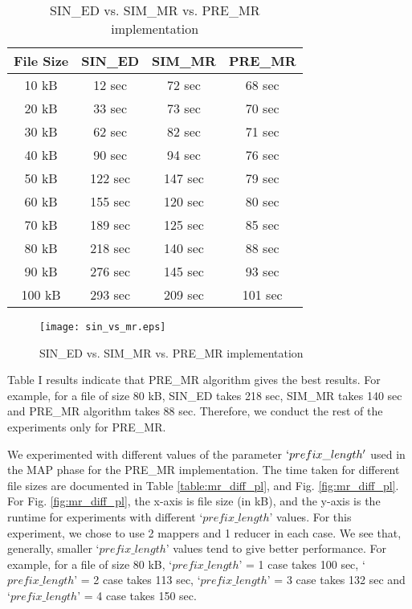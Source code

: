 \documentclass[conference]{IEEEtran}
\begin{document}
\begin{table}[htbp]
\caption{SIN\_ED vs. SIM\_MR vs. PRE\_MR implementation}
\centering
\vspace{5pt}
\begin{tabular}{|c|c|c|c|}
\hline
\textbf{File Size} & \textbf{SIN\_ED} & \textbf{SIM\_MR} & \textbf{PRE\_MR} \\
\hline\hline
10 kB & 12 sec & 72 sec & 68 sec \\
\hline
20 kB & 33 sec & 73 sec & 70 sec \\
\hline
30 kB & 62 sec & 82 sec & 71 sec \\
\hline
40 kB & 90 sec & 94 sec & 76 sec \\
\hline
50 kB & 122 sec & 147 sec & 79 sec \\
\hline
60 kB & 155 sec & 120 sec & 80 sec \\
\hline
70 kB & 189 sec & 125 sec & 85 sec \\
\hline
80 kB & 218 sec & 140 sec & 88 sec \\
\hline
90 kB & 276 sec & 145 sec & 93 sec \\
\hline
100 kB & 293 sec & 209 sec & 101 sec \\
\hline
\end{tabular}
\label{table:sin_vs_mr}
\end{table}

\begin{figure}[htbp]
\begin{center}
\texttt{[image: sin\_vs\_mr.eps]}
\end{center}
\caption{SIN\_ED vs. SIM\_MR vs. PRE\_MR implementation}
\label{fig:sin_vs_mr}
\end{figure}

Table I results indicate that PRE\_MR algorithm gives the best results. For example, for a file of size 80 kB, SIN\_ED takes 218 sec, SIM\_MR takes 140 sec and PRE\_MR algorithm takes 88 sec. Therefore, we conduct the rest of the experiments only for PRE\_MR.

We experimented with different values of the parameter $`prefix\_length'$ used in the MAP phase for the PRE\_MR implementation. The time taken for different file sizes are documented in Table \ref{table:mr_diff_pl}, and Fig. \ref{fig:mr_diff_pl}. For Fig. \ref{fig:mr_diff_pl}, the x-axis is file size (in kB), and the y-axis is the runtime for experiments with different `$prefix\_length$' values. For this experiment, we chose to use 2 mappers and 1 reducer in each case. We see that, generally, smaller `$prefix\_length$' values tend to give better performance. For example, for a file of size 80 kB, `$prefix\_length$' = 1 case takes 100 sec, `$prefix\_length$' = 2 case takes 113 sec, `$prefix\_length$' = 3 case takes 132 sec and `$prefix\_length$' = 4 case takes 150 sec.
\end{document}
